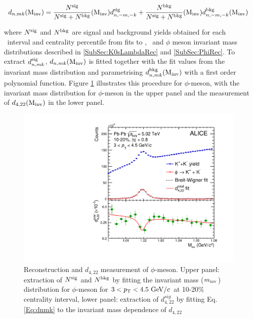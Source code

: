 \begin{equation}
d_{n,mk}({\rm M}_{\rm inv}) = \frac{N^{\rm sig}}{N^{\rm sig}+N^{\rm bkg}}({\rm M}_{\rm inv})d_{n,-m,-k}^{\rm sig}+\frac{N^{\rm bkg}}{N^{{\rm sig}}+N^{{\rm bkg}}}({\rm M}_{\rm inv})d_{n,-m,-k}^{\rm bkg}({\rm M}_{\rm inv})
\label{Eq:dnmk}
\end{equation}

where $N^{\rm{sig}}$ and $N^{\rm{bkg}}$ are signal and background yields obtained for each \pT~interval and centrality percentile from fits to \Ks, \lambdas~and $\phi$ meson invariant mass distributions described in \ref{SubSec:K0sLambdaRec} and \ref{SubSec:PhiRec}. To extract $d_{n,mk}^{\rm{sig}}$, $d_{n,mk}({\rm M_{inv}})$ is fitted together with the fit values from the invariant mass distribution and parametrising $d_{n,mk}^{\rm{bkg}}({\rm M_{inv}})$ with a first order polynomial function. Figure \ref{d422_phi_meson} illustrates this procedure for $\phi$-meson, with the invariant mass distribution for $\phi$-meson in the upper panel and the measurement of $d_{4,22}({\rm M_{inv}})$ in the lower panel. 

\begin{figure}[!htb]
\begin{center}
\includegraphics[scale=0.45]{figures/analysisMethod/flowmass_Phi.pdf}
\end{center}
\caption{Reconstruction and $d_{4,22}$ measurement of $\phi$-meson. Upper panel: extraction of $N^{\rm{sig}}$ and $N^{\rm{bkg}}$ by fitting the invariant mass ($m_{\rm{inv}}$) distribution for $\phi$-meson for $3<p_{\rm{T}}<4.5~{\rm GeV}/c$ at 10-20\% centrality interval, lower panel: extraction of $d_{4,22}^{sig}$ by fitting Eq. \ref{Eq:dnmk} to the invariant mass dependence of $d_{4,22}$}
\label{d422_phi_meson}
\end{figure}


